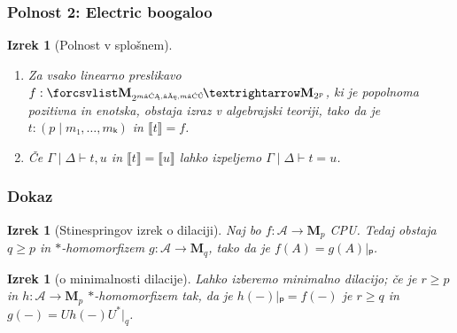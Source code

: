 \documentclass[handout, slovene]{beamer}
\newtheorem{izrek}[theorem]{Izrek}
\newcommand{\p}[1]{\left( {#1} \right)}
\newcommand{\mc}[1]{\mathcal{#1}}
\newcommand{\M}[1][]{\mathbf{M}_{#1}}
\newcommand{\arity}[2]{\p{#1 \mid #2}}
\newcommand{\sequent}[3]{#1 \mid #2 \vdash #3}
\newcommand{\seq}[1]{\sequent{\Gamma}{\Delta}{#1}}
\newcommand{\sem}[1]{⟦ #1 ⟧}
\newcommand{\semmap}[2]{%
  \def\nextitem{\def\nextitem{⊕}}%
  \forcsvlist\semmapitem{#2} → \M[2^{#1}]
}
\newcommand{\semmapitem}[1]{%
  \nextitem
  \if\detokenize{#1}…%
    ⋯%
  \else%
    \M[2^{\detokenize{#1}}]\!%
  \fi
}
\begin{document}
\begin{frame}
    \frametitle{Polnost 2: Electric boogaloo}

    \begin{izrek}[Polnost v splošnem]
        \begin{enumerate}
            \item Za vsako linearno preslikavo \(f : \semmap{p}{m₁,…,mₖ}\), ki je popolnoma pozitivna in enotska, obstaja izraz v algebrajski teoriji, tako da je
            \(t : \arity{p}{m₁, …, mₖ}\) in \(\sem{t} = f\).
            \item Če \(\seq{t, u}\) in \(\sem{t} = \sem{u}\) lahko izpeljemo \(\seq{t=u}\).
        \end{enumerate}
    \end{izrek}

\end{frame}
\begin{frame}[fragile]
    \frametitle{Dokaz}

    \begin{izrek}[Stinespringov izrek o dilaciji]
        Naj bo \(f : \mc A → \M[p]\) CPU. Tedaj obstaja \(q ≥ p\) in \(*\)-homomorfizem \(g : \mc A → \M[q]\), tako da je \(f(A) = g(A)|ₚ\).

    \end{izrek}

    \pause
    \begin{izrek}[o minimalnosti dilacije]
        Lahko izberemo minimalno dilacijo; če je \(r ≥ p\) in \( h : \mc A → \M[p] \) \(*\)-homomorfizem tak, da je \( h(-)|ₚ = f(-) \) je \(r ≥ q\) in \(g(-) = Uh(-)U^*|_q\).
    \end{izrek}

\end{frame}

\end{document}
